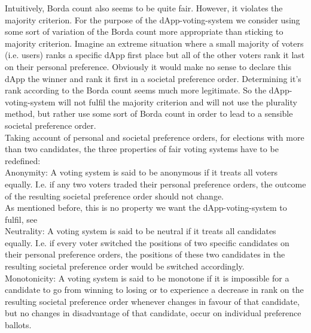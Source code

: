 Intuitively, Borda count also seems to be quite fair. However, it violates the majority criterion. For the purpose of the dApp-voting-system we consider using some sort of variation of the Borda count more appropriate than sticking to majority criterion. Imagine an extreme situation where a small majority of voters (i.e. users) ranks a specific dApp first place but all of the other voters rank it last on their personal preference. Obviously it would make no sense to declare this dApp the winner and rank it first in a societal preference order. Determining it's rank according to the Borda count seems much more legitimate. So the dApp-voting-system will not fulfil the majority criterion and will not use the plurality method, but rather use some sort of Borda count in order to lead to a sensible societal preference order. \\
Taking account of personal and societal preference orders, for elections with more than two candidates, the three properties of fair voting systems have to be redefined: \\
Anonymity: A voting system is said to be anonymous if it treats all voters equally. I.e. if any two voters traded their personal preference orders, the outcome of the resulting societal preference order should not change. \\
As mentioned before, this is no property we want the dApp-voting-system to fulfil, see \\ %
Neutrality: A voting system is said to be neutral if it treats all candidates equally. I.e. if every voter switched the positions of two specific candidates on their personal preference orders, the positions of these two candidates in the resulting societal preference order would be switched accordingly. \\
Monotonicity: A voting system is said to be monotone if it is impossible for a candidate to go from winning to losing or to experience a decrease in rank on the resulting societal preference order whenever changes in favour of that candidate, but no changes in disadvantage of that candidate, occur on individual preference ballots. 






